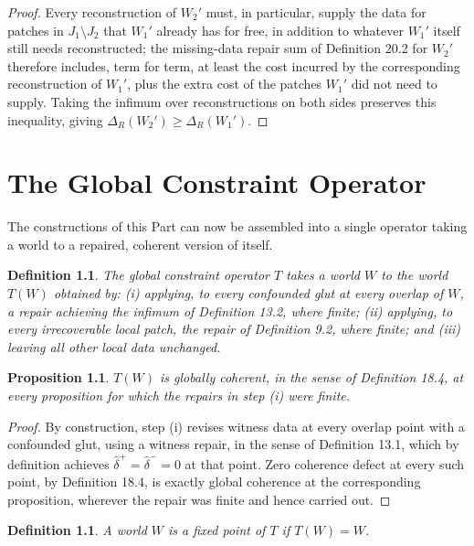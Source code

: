 \documentclass[11pt]{book}
\newtheorem{definition}[theorem]{Definition}
\newtheorem{proposition}[theorem]{Proposition}
\begin{document}
\begin{proof}
Every reconstruction of $W_2'$ must, in particular, supply the data for patches in $J_1 \setminus J_2$ that $W_1'$ already has for free, in addition to whatever $W_1'$ itself still needs reconstructed; the missing-data repair sum of Definition 20.2 for $W_2'$ therefore includes, term for term, at least the cost incurred by the corresponding reconstruction of $W_1'$, plus the extra cost of the patches $W_1'$ did not need to supply. Taking the infimum over reconstructions on both sides preserves this inequality, giving $\Delta_R(W_2') \geq \Delta_R(W_1')$.
\end{proof}

\chapter{The Global Constraint Operator}

The constructions of this Part can now be assembled into a single operator taking a world to a repaired, coherent version of itself.

\begin{definition}
The \emph{global constraint operator} $T$ takes a world $W$ to the world $T(W)$ obtained by: (i) applying, to every confounded glut at every overlap of $W$, a repair achieving the infimum of Definition 13.2, where finite; (ii) applying, to every irrecoverable local patch, the repair of Definition 9.2, where finite; and (iii) leaving all other local data unchanged.
\end{definition}

\begin{proposition}
$T(W)$ is globally coherent, in the sense of Definition 18.4, at every proposition for which the repairs in step (i) were finite.
\end{proposition}

\begin{proof}
By construction, step (i) revises witness data at every overlap point with a confounded glut, using a witness repair, in the sense of Definition 13.1, which by definition achieves $\hat\delta^+ = \hat\delta^- = 0$ at that point. Zero coherence defect at every such point, by Definition 18.4, is exactly global coherence at the corresponding proposition, wherever the repair was finite and hence carried out.
\end{proof}

\begin{definition}
A world $W$ is a \emph{fixed point} of $T$ if $T(W) = W$.
\end{definition}
\end{document}
